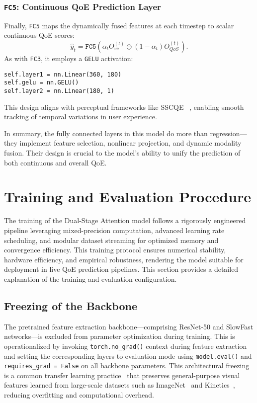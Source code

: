 \subsubsection*{\texttt{FC5}: Continuous QoE Prediction Layer}

Finally, \texttt{FC5} maps the dynamically fused features at each timestep to scalar continuous QoE scores:
\begin{equation}
    \hat{y}_t = \texttt{FC5} \left( \alpha_t O_{vc}^{(t)} \oplus (1 - \alpha_t) O_{QoS}^{(t)} \right).
\end{equation}
As with \texttt{FC3}, it employs a \texttt{GELU} activation:
\begin{verbatim}
self.layer1 = nn.Linear(360, 180)
self.gelu = nn.GELU()
self.layer2 = nn.Linear(180, 1)
\end{verbatim}
This design aligns with perceptual frameworks like SSCQE ~\cite{alpert1991sscqe}, enabling smooth tracking of temporal variations in user experience.

\bigskip
In summary, the fully connected layers in this model do more than regression—they implement feature selection, nonlinear projection, and dynamic modality fusion. Their design is crucial to the model’s ability to unify the prediction of both continuous and overall QoE.

\section{Training and Evaluation Procedure}
\label{sec:training-evaluation}

The training of the Dual-Stage Attention model follows a rigorously engineered pipeline leveraging mixed-precision computation, advanced learning rate scheduling, and modular dataset streaming for optimized memory and convergence efficiency. This training protocol ensures numerical stability, hardware efficiency, and empirical robustness, rendering the model suitable for deployment in live QoE prediction pipelines. This section provides a detailed explanation of the training and evaluation configuration.

\subsection{Freezing of the Backbone}
The pretrained feature extraction backbone---comprising ResNet-50 and SlowFast networks---is excluded from parameter optimization during training. This is operationalized by invoking \texttt{torch.no\_grad()} context during feature extraction and setting the corresponding layers to evaluation mode using \texttt{model.eval()} and \texttt{requires\_grad = False} on all backbone parameters. This architectural freezing is a common transfer learning practice~\cite{yosinski2014transferable} that preserves general-purpose visual features learned from large-scale datasets such as ImageNet~\cite{deng2009imagenet} and Kinetics~\cite{kay2017kinetics}, reducing overfitting and computational overhead.

